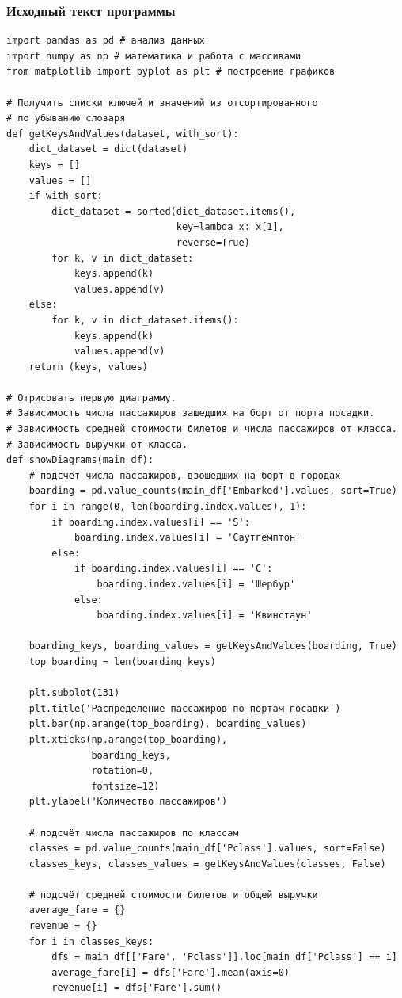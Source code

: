 \documentclass[a4paper]{article}
\begin{document}
\subsubsection{Исходный текст программы}
\normalsize{
    \begin{verbatim}
import pandas as pd # анализ данных
import numpy as np # математика и работа с массивами
from matplotlib import pyplot as plt # построение графиков

# Получить списки ключей и значений из отсортированного 
# по убыванию словаря
def getKeysAndValues(dataset, with_sort):
    dict_dataset = dict(dataset)
    keys = []
    values = []
    if with_sort:
        dict_dataset = sorted(dict_dataset.items(),
                              key=lambda x: x[1],
                              reverse=True)
        for k, v in dict_dataset:
            keys.append(k)
            values.append(v)
    else:
        for k, v in dict_dataset.items():
            keys.append(k)
            values.append(v)
    return (keys, values)

# Отрисовать первую диаграмму.
# Зависимость числа пассажиров зашедших на борт от порта посадки.
# Зависимость средней стоимости билетов и числа пассажиров от класса.
# Зависимость выручки от класса.
def showDiagrams(main_df):
    # подсчёт числа пассажиров, взошедших на борт в городах
    boarding = pd.value_counts(main_df['Embarked'].values, sort=True)
    for i in range(0, len(boarding.index.values), 1):
        if boarding.index.values[i] == 'S':
            boarding.index.values[i] = 'Саутгемптон'
        else:
            if boarding.index.values[i] == 'C':
                boarding.index.values[i] = 'Шербур'
            else:
                boarding.index.values[i] = 'Квинстаун'

    boarding_keys, boarding_values = getKeysAndValues(boarding, True)
    top_boarding = len(boarding_keys)

    plt.subplot(131)
    plt.title('Распределение пассажиров по портам посадки')
    plt.bar(np.arange(top_boarding), boarding_values)
    plt.xticks(np.arange(top_boarding), 
               boarding_keys, 
               rotation=0,
               fontsize=12)
    plt.ylabel('Количество пассажиров')

    # подсчёт числа пассажиров по классам
    classes = pd.value_counts(main_df['Pclass'].values, sort=False)
    classes_keys, classes_values = getKeysAndValues(classes, False)

    # подсчёт средней стоимости билетов и общей выручки
    average_fare = {}
    revenue = {}
    for i in classes_keys:
        dfs = main_df[['Fare', 'Pclass']].loc[main_df['Pclass'] == i]
        average_fare[i] = dfs['Fare'].mean(axis=0)
        revenue[i] = dfs['Fare'].sum()
        

\end{verbatim}}
\end{document}
